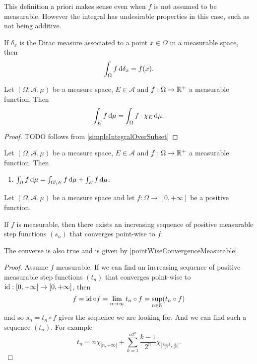 This definition a priori makes sense even when $f$ is not assumed to be measurable. However the integral has undesirable properties in this case, such as not being additive.

\begin{example}
If $\delta_x$ is the Dirac measure associated to a point $x\in\Omega$ in a measurable space, then
\[ \int_\Omega f \operatorname{d \!}{\delta_x} = f(x). \]
\end{example}

\begin{lemma} \label{integralOverSubset}
Let $(\Omega, \mathcal{A}, \mu)$ be a measure space, $E\in\mathcal{A}$ and $f:\Omega\to \mathbb{R}^+$ a measurable function. Then
\[ \int_E f \operatorname{d \!}{\mu} = \int_\Omega f\cdot\chi_{E} \operatorname{d \!}{\mu}. \]
\end{lemma}
\begin{proof}
TODO follows from \ref{simpleIntegralOverSubset}
\end{proof}
\begin{corollary}
Let $(\Omega, \mathcal{A}, \mu)$ be a measure space, $E\in\mathcal{A}$ and $f:\Omega\to \mathbb{R}^+$ a measurable function. Then
\begin{enumerate}
\item $\int_\Omega f\operatorname{d \!}{\mu} = \int_{\Omega\setminus E} f\operatorname{d \!}{\mu}+\int_E f\operatorname{d \!}{\mu}$.
\end{enumerate}
\end{corollary}

\begin{proposition}
Let $(\Omega, \mathcal{A}, \mu)$ be a measure space and let $f:\Omega\to[0,+\infty]$ be a positive function.

If $f$ is measurable, then there exists an increasing sequence of positive measurable step functions $(s_n)$ that converges point-wise to $f$.
\end{proposition}
The converse is also true and is given by \ref{pointWiseConvergenceMeasurable}.
\begin{proof}
Assume $f$ measurable. If we can find an increasing sequence of positive measurable step functions $(t_n)$ that converges point-wise to $\operatorname{id}:[0,+\infty]\to[0,+\infty]$, then
\[ f = \operatorname{id}\circ f = \lim_{n\to\infty} t_n\circ f = \sup_{n\in\mathbb{N}}(t_n\circ f) \]
and so $s_n = t_n\circ f$ gives the sequence we are looking for. And we can find such a sequence $(t_n)$. For example
\[ t_n = n\chi_{[n,+\infty[}+\sum_{k=1}^{n2^n}\frac{k-1}{2^n}\chi_{[\frac{k-1}{2^n},\frac{k}{2^n}[}. \]
\end{proof}

